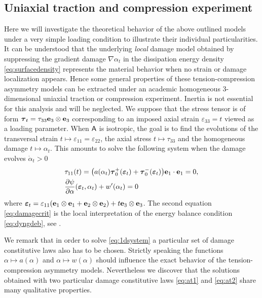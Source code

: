 \subsection{Uniaxial traction and compression experiment} \label{sec:uniaxial}
Here we will investigate the theoretical behavior of the above outlined models under a very simple loading condition to illustrate their individual particularities. It can be understood that the underlying \emph{local} damage model obtained by suppressing the gradient damage $\nabla\alpha_t$ in the dissipation energy density \eqref{eq:surfacedensity} represents the material behavior when no strain or damage localization appears. Hence some general properties of these tension-compression asymmetry models can be extracted under an academic homogeneous 3-dimensional uniaxial traction or compression experiment. Inertia is not essential for this analysis and will be neglected. We suppose that the stress tensor is of form $\vtau_t=\tau_{33}\vec{e}_3\otimes\vec{e}_3$ corresponding to an imposed axial strain $\varepsilon_{33}=t$ viewed as a loading parameter. When $\mathsf{A}$ is isotropic, the goal is to find the evolutions of the transversal strain $t\mapsto\varepsilon_{11}=\varepsilon_{22}$, the axial stress $t\mapsto\tau_{33}$ and the homogeneous damage $t\mapsto \alpha_t$. This amounts to solve the following system when the damage evolves $\dot{\alpha}_t>0$
\begin{subequations} \label{eq:1dsystem}
\begin{align}
& \tau_{11}(t)=\bigl(a(\alpha_t)\vtau_0^+(\eps_t)+\vtau_0^-(\eps_t)\bigr)\vec{e}_1\cdot\vec{e}_1=0, \label{eq:eps11as33} \\
& \frac{\partial\psi}{\partial\alpha}(\eps_t,\alpha_t)+w'(\alpha_t)=0 \label{eq:damagecrit}
\end{align}
\end{subequations}
where $\eps_t=\varepsilon_{11}(\vec{e}_1\otimes\vec{e}_1+\vec{e}_2\otimes\vec{e}_2)+t\vec{e}_3\otimes\vec{e}_3$. The second equation \eqref{eq:damagecrit} is the local interpretation of the energy balance condition \eqref{eq:dyngdeb}, see \cite{SicsicMarigo:2013}.

We remark that in order to solve \eqref{eq:1dsystem} a particular set of damage constitutive laws also has to be chosen. Strictly speaking the functions $\alpha\mapsto a(\alpha)$ and $\alpha\mapsto w(\alpha)$ should influence the exact behavior of the tension-compression asymmetry models. Nevertheless we discover that the solutions obtained with two particular damage constitutive laws \eqref{eq:at1} and \eqref{eq:at2} share many qualitative properties.

